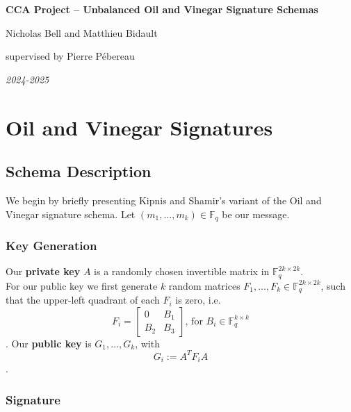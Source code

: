\documentclass[12pt, a4paper]{article}
\begin{document}
	
	
	\begin{titlepage}
		\centering
		{\Huge\textbf{CCA Project -- Unbalanced Oil and Vinegar Signature Schemas}\par}
		\vspace{0.5cm}
		{\Large Nicholas Bell and Matthieu Bidault\par}
		\vspace{0.5cm}
		{\Large supervised by Pierre Pébereau\par}
		\vfill
		\textit{2024-2025}
		\vspace*{\fill}
	\end{titlepage}
	
	\setcounter{tocdepth}{3}
	\tableofcontents
	\thispagestyle{fancy}
	\newpage
	
	\section{Oil and Vinegar Signatures}
	
	\subsection{Schema Description}
	
	We begin by briefly presenting Kipnis and Shamir's variant of the Oil and Vinegar signature schema. Let $(m_1,\dots,m_k) \in \mathbb{F}_q$ be our message.
	
	\subsubsection{Key Generation}
	
	Our \textbf{private key} $A$ is a randomly chosen invertible matrix in $\mathbb{F}_q^{2k\times2k}$.\\
	
	For our public key we first generate $k$ random matrices $F_1,\dots,F_k \in \mathbb{F}_q^{2k\times2k}$, such that the upper-left quadrant of each $F_i$ is zero, i.e. $$F_i = \begin{bmatrix}
	0 & B_1\\
	B_2 & B_3
	\end{bmatrix}\text{, for }B_i \in \mathbb{F}_q^{k\times k}$$. Our \textbf{public key} is $G_1,\dots,G_k$, with $$G_i := A^TF_iA$$.
	
	\subsubsection{Signature}
	
\end{document}
